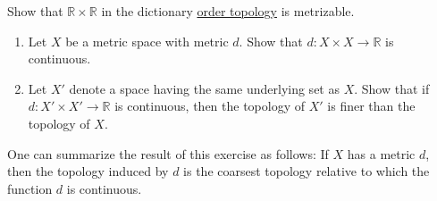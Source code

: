   \begin{exercise}[Munkres 20.2]
    Show that $\mathbb{R} \times \mathbb{R}$ in the dictionary \hyperref[def:order-topology]{order topology} is metrizable.
  \end{exercise}

  \begin{exercise}[Munkres 20.3]
    \begin{enumerate} 
      \item[(a)] Let $X$ be a metric space with metric $d$. Show that $d : X \times X \to \mathbb{R}$ is continuous.
      
      \item[(b)] Let $X'$ denote a space having the same underlying set as $X$. Show that if $d : X' \times X' \to \mathbb{R}$ is continuous, then the topology of $X'$ is finer than the topology of $X$.
    \end{enumerate}
    
    One can summarize the result of this exercise as follows: If $X$ has a metric $d$, then the topology induced by $d$ is the coarsest topology relative to which the function $d$ is continuous.
  \end{exercise}

